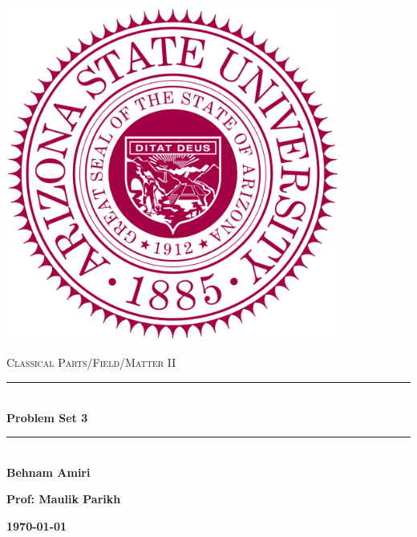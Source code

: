 \documentclass[fleqn]{article}
\begin{document}
  \begin{titlepage}

    \newcommand{\HRule}{\rule{\linewidth}{0.5mm}}

    \center

    \begin{center}
      \includegraphics[height=11cm, width=11cm]{asu.png}
    \end{center}

    \vline

    \textsc{\LARGE Classical Parts/Field/Matter II}\\[1.5cm]

    \HRule \\[0.5cm]
    { \huge \bfseries Problem Set 3}\\[0.4cm] 
    \HRule \\[1.0cm]

    \textbf{Behnam Amiri}

    \bigbreak

    \textbf{Prof: Maulik Parikh}

    \bigbreak

    \textbf{{\large \today}\\[2cm]}

    \vfill

  \end{titlepage}
\end{document}
